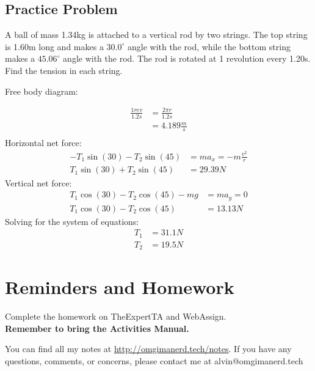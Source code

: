 \documentclass{math}
\begin{document}
\subsection*{Practice Problem}
A ball of mass 1.34kg is attached to a vertical rod by two strings. The top
string is 1.60m long and makes a \( 30.0^{\circ} \) angle with the rod, while
the bottom string makes a \( 45.06^{\circ} \) angle with the rod. The rod is
rotated at 1 revolution every 1.20s. Find the tension in each string.
\begin{center}
\end{center}
Free body diagram:
\begin{center}
\end{center}
\begin{align*}
  \frac{1rev}{1.2s} &= \frac{2\pi r}{1.2s} \\
  &= 4.189\frac{m}{s} \\
\end{align*}
Horizontal net force:
\begin{align*}
  -T_1\sin(30)-T_2\sin(45) &= ma_x = -m\frac{v^2}{r} \\
  T_1\sin(30)+T_2\sin(45) &= 29.39N
\end{align*}
Vertical net force:
\begin{align*}
  T_1\cos(30)-T_2\cos(45)-mg &= ma_y = 0 \\
  T_1\cos(30)-T_2\cos(45) &= 13.13N
\end{align*}
Solving for the system of equations:
\begin{align*}
  T_1 &= 31.1N \\
  T_2 &= 19.5N
\end{align*}

\section*{Reminders and Homework}
Complete the homework on TheExpertTA and WebAssign. \\
\textbf{Remember to bring the Activities Manual.} \\

\begin{center}
  You can find all my notes at \url{http://omgimanerd.tech/notes}. If you have
  any questions, comments, or concerns, please contact me at
  alvin@omgimanerd.tech
\end{center}
\end{document}
